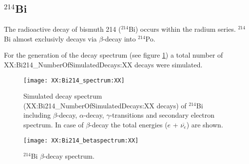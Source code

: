 \subsection{$^{214}$Bi}

The radioactive decay of bismuth 214 ($^{214}$Bi) occurs within the radium series. $^{214}$Bi almost exclusivly decays via $\beta$-decay into $^{214}$Po.

For the generation of the decay spectrum (see figure \ref{fig:Bi214spectrum}) a total number of XX:Bi214_NumberOfSimulatedDecays:XX decays were simulated.

\begin{figure}[h]
\centering
	\texttt{[image: XX:Bi214\_spectrum:XX]}
	\caption[$^{214}$Bi decay spectrum]{Simulated decay spectrum (XX:Bi214_NumberOfSimulatedDecays:XX decays) of $^{214}$Bi including $\beta$-decay, $\alpha$-decay, $\gamma$-transitions and secondary electron spectrum. In case of $\beta$-decay the total energies ($e$ + $\overline{\nu_{e}}$) are shown.}
	\label{fig:Bi214spectrum}
\end{figure}

\begin{figure}[h]
\centering
	\texttt{[image: XX:Bi214\_betaspectrum:XX]}
	\caption[$^{214}$Bi $\beta$-decay spectrum]{$^{214}$Bi $\beta$-decay spectrum.}
	\label{fig:Bi214betaspectrum}
\end{figure}

